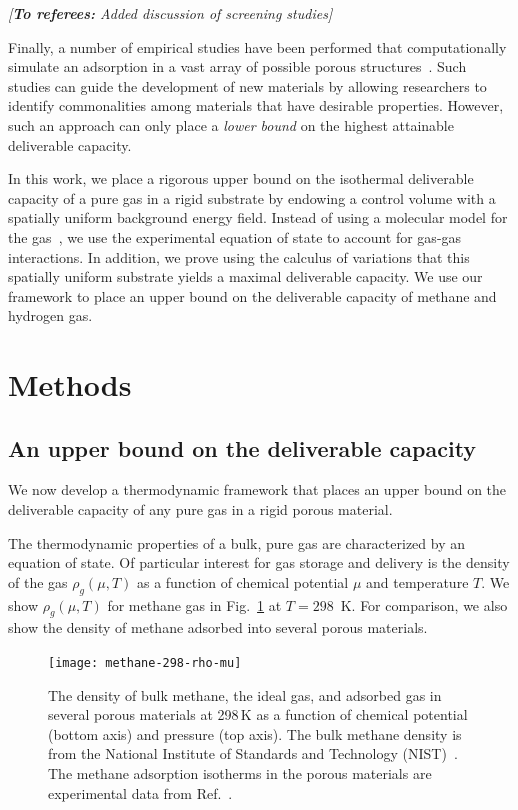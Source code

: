 \documentclass[twoside,twocolumn,9pt]{article}
\newcommand\startreferees[1]{\cbstart \noindent\textit{\color{red}%
[\textbf{To referees:} #1]}

}
\newcommand\donereferees{\cbend}
\begin{document}
\startreferees{Added discussion of screening studies}
Finally, a number of empirical studies have been performed that computationally
simulate an adsorption in a vast array of possible porous
structures~\cite{firlej2013understanding, goldsmith2013theoretical,
ahmed2019exceptional}.  Such studies can guide the development of new materials
by allowing researchers to identify commonalities among materials that have
desirable properties.  However, such an approach can only place a \emph{lower
bound} on the highest attainable deliverable capacity.

\donereferees


In this work, we place a rigorous upper bound on the isothermal deliverable capacity of a
pure gas in a rigid substrate by endowing a control volume with a spatially
uniform background energy field. Instead of using a molecular model for the
gas~\cite{gomez2017impact}, we use the experimental equation of state to
account for gas-gas interactions. In addition, we prove using the calculus of
variations that this spatially uniform substrate yields a maximal deliverable
capacity. We use our framework to place an upper bound on the deliverable
capacity of methane and hydrogen gas.

\section{Methods}
\subsection{An upper bound on the deliverable capacity}\label{sec:upper-bound}
We now develop a thermodynamic framework that places an upper bound on the deliverable capacity of any pure gas in a rigid porous material.

The thermodynamic properties of a bulk, pure gas are characterized by an
equation of state. Of particular interest for gas storage and delivery is the
density of the gas $\rho_g(\mu,T)$ as a function of chemical potential $\mu$
and temperature $T$. We show $\rho_g(\mu, T)$ for methane gas in
Fig.~\ref{fig:density-vs-mu-ch4} at $T=298$\ K. For comparison, we also show
the density of methane adsorbed into several porous materials.

\begin{figure}
    \centering
    \texttt{[image: methane-298-rho-mu]}
    \caption{The density of bulk methane, the ideal gas, and adsorbed gas in several porous materials at 298\,K as a function of chemical potential (bottom axis) and pressure (top axis). The bulk methane density is from the National Institute of Standards and Technology (NIST)~\cite{nist}. The methane adsorption isotherms in the porous materials are experimental data from Ref.~\cite{mason2014evaluating, furukawa2009storage, tian2018sol, gandara2014high, zhang2017fine}.
    }
    \label{fig:density-vs-mu-ch4}
  \end{figure}
  
\end{document}
